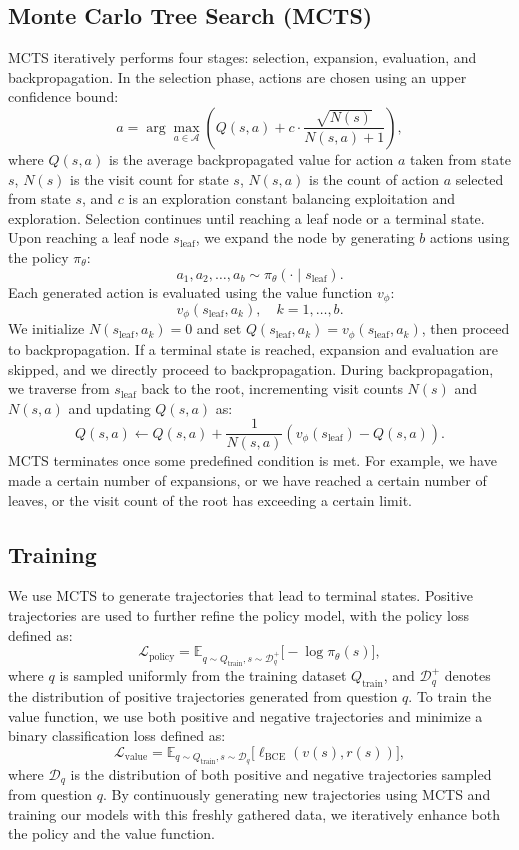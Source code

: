 \documentclass{article}
\begin{document}
\subsection{Monte Carlo Tree Search (MCTS)}
MCTS iteratively performs four stages: selection, expansion, evaluation, and backpropagation. In the selection phase, actions are chosen using an upper confidence bound:
$$
a = \arg\max_{a \in \mathcal{A}} \left(Q(s,a) + c \cdot \frac{\sqrt{N(s)}}{N(s,a) + 1}\right),
$$
where \(Q(s,a)\) is the average backpropagated value for action \(a\) taken from state \(s\), \(N(s)\) is the visit count for state \(s\), \(N(s,a)\) is the count of action \(a\) selected from state \(s\), and \(c\) is an exploration constant balancing exploitation and exploration. Selection continues until reaching a leaf node or a terminal state. Upon reaching a leaf node \(s_{\text{leaf}}\), we expand the node by generating \(b\) actions using the policy \(\pi_\theta\):
$$
a_1, a_2, \ldots, a_b \sim \pi_\theta(\cdot \mid s_{\text{leaf}}).
$$
Each generated action is evaluated using the value function \(v_\phi\):
$$
v_\phi(s_{\text{leaf}}, a_k), \quad k=1, \ldots, b.
$$
We initialize \(N(s_{\text{leaf}},a_k) = 0\) and set \(Q(s_{\text{leaf}},a_k) = v_{\phi}(s_{\text{leaf}},a_k)\), then proceed to backpropagation. If a terminal state is reached, expansion and evaluation are skipped, and we directly proceed to backpropagation. During backpropagation, we traverse from \(s_{\text{leaf}}\) back to the root, incrementing visit counts \(N(s)\) and \(N(s,a)\) and updating \(Q(s,a)\) as:
$$
Q(s,a) \leftarrow Q(s,a) + \frac{1}{N(s,a)} \left(v_{\phi}(s_{\text{leaf}}) - Q(s,a)\right).
$$
MCTS terminates once some predefined condition is met. For example, we have made a certain number of expansions, or we have reached a certain number of leaves, or the visit count of the root has exceeding a certain limit.

\subsection{Training}
We use MCTS to generate trajectories that lead to terminal states. Positive trajectories are used to further refine the policy model, with the policy loss defined as:
\[
\mathcal{L}_{\text{policy}} = \mathbb{E}_{q \sim Q_{\text{train}}, s\sim\mathcal{D}_q^+}\Big[-\log \pi_\theta(s)\Big],
\]
where \(q\) is sampled uniformly from the training dataset \(Q_{\text{train}}\), and \(\mathcal{D}_q^+\) denotes the distribution of positive trajectories generated from question \(q\). To train the value function, we use both positive and negative trajectories and minimize a binary classification loss defined as:
\[
\mathcal{L}_{\text{value}} = \mathbb{E}_{q \sim Q_{\text{train}}, s \sim \mathcal{D}_q} \Big[ \ell_{\text{BCE}} (v(s), r(s)) \Big],
\]
where \(\mathcal{D}_q\) is the distribution of both positive and negative trajectories sampled from question \(q\). By continuously generating new trajectories using MCTS and training our models with this freshly gathered data, we iteratively enhance both the policy and the value function.
\end{document}
